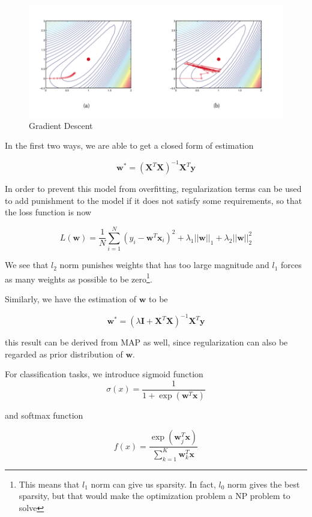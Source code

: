 \documentclass[10pt,twocolumn,letterpaper]{article}
\begin{document}
	\begin{figure}[h]
			\begin{center}
				\includegraphics[width=0.9\linewidth]{images/gd}
				\caption{Gradient Descent\cite{murphy_2013}}
			\end{center}
		\end{figure}
	
	In the first two ways, we are able to get a closed form of estimation
	
	\[\mathbf{w}^* = (\mathbf{X}^T\mathbf{X})^{-1}\mathbf{X}^T\mathbf{y}\]
	
	In order to prevent this model from overfitting, regularization terms can be used to add punishment to the model if it does not satisfy some requirements, so that the loss function is now
	
	\[L(\mathbf{w}) = \frac{1}{N} \sum_{i = 1}^N (y_i - \mathbf{w}^T\mathbf{x}_i)^2 + \lambda_1 ||\mathbf{w}||_1 + \lambda_2 ||\mathbf{w}||_2^2\]
	
	We see that $l_2$ norm punishes weights that has too large magnitude and $l_1$ forces as many weights as possible to be zero\footnote{This means that $l_1$ norm can give us sparsity. In fact, $l_0$ norm gives the best sparsity, but that would make the optimization problem a NP problem to solve}.
	
	Similarly, we have the estimation of $\mathbf{w}$ to be
	
		\[\mathbf{w}^* = (\lambda\mathbf{I} + \mathbf{X}^T\mathbf{X})^{-1}\mathbf{X}^T\mathbf{y}\]
		
	this result can be derived from MAP as well, since regularization can also be regarded as prior distribution of $\mathbf{w}$\cite{bishop}.
	
	For classification tasks, we introduce sigmoid function\cite{alpaydin2004introduction}
		\[\sigma(x) = \frac{1}{1 + \exp(\mathbf{w}^T\mathbf{x})}\]
		
	and softmax function\cite{alpaydin2004introduction}
	
		\[f(x) = \frac{\exp(\mathbf{w}_j^T\mathbf{x})}{\sum_{k = 1}^K \mathbf{w}_k^T\mathbf{x}}\]
	
\end{document}
